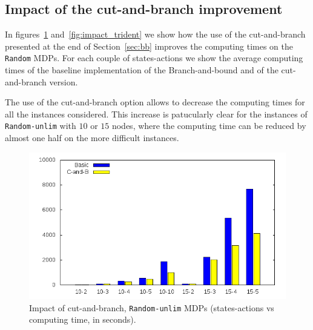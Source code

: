

\subsection{Impact of the cut-and-branch improvement}

In figures~\ref{fig:impact_random} and~\ref{fig:impact_trident} we show how the use of the cut-and-branch presented at the end of Section~\ref{sec:bb} improves the computing times on the \texttt{Random} MDPs.
For each couple of states-actions we show the average computing times of the baseline implementation of the Branch-and-bound and of the cut-and-branch version.

The use of the cut-and-branch option allows to decrease the computing times for all the instances considered. This increase is patucularly clear for the instances of \texttt{Random-unlim} with $10$ or $15$ nodes, where the computing time can be reduced by almost one half on the more difficult instances.

\begin{figure}[]
	\begin{center}
    \includegraphics[scale=0.45]{GNUPLOT/output_random.png}
	\end{center}
	\caption{Impact of cut-and-branch, \texttt{Random-unlim} MDPs (states-actions vs computing time, in seconds).}
	\label{fig:impact_random} 
\end{figure}

